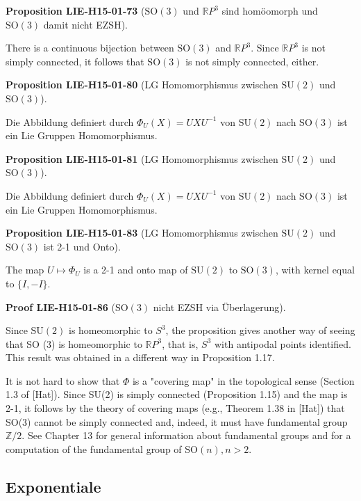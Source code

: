 \documentclass[10pt, letterpaper]{article}
\newcommand{\R}{\mathbb{R}}
\newcommand{\SO}{\mathrm{SO}}
\newcommand{\SU}{\mathrm{SU}}
\newcommand{\CustomHeading}[3]{%
  \par\medskip\noindent%
  \textbf{#1 #2} \textnormal{(#3)}.\enskip%
}
\newenvironment{PROP}[2]{\CustomHeading{Proposition}{#1}{#2}}{}
\newenvironment{PROOF}[2]{\CustomHeading{Proof}{#1}{#2}}{}
\begin{document}
\begin{PROP}{LIE-H15-01-73}{$\SO(3)$ und $\R P^3$ sind homöomorph und $\SO(3)$ damit nicht EZSH}
There is a continuous bijection between $\mathrm{SO}(3)$ and $\mathbb{R} P^{3}$. Since $\mathbb{R} P^{3}$ is not simply connected, it follows that $\mathrm{SO}(3)$ is not simply connected, either.
\end{PROP}

\begin{PROP}{LIE-H15-01-80}{LG Homomorphismus zwischen $\SU(2)$ und $\SO(3)$}
Die Abbildung definiert durch $\Phi_{U}(X)=U X U^{-1}$ von $\SU(2)$ nach $\SO(3)$ ist ein Lie Gruppen Homomorphismus.
\end{PROP}

\begin{PROP}{LIE-H15-01-81}{LG Homomorphismus zwischen $\SU(2)$ und $\SO(3)$}
Die Abbildung definiert durch $\Phi_{U}(X)=U X U^{-1}$ von $\SU(2)$ nach $\SO(3)$ ist ein Lie Gruppen Homomorphismus.
\end{PROP}

\begin{PROP}{LIE-H15-01-83}{LG Homomorphismus zwischen $\SU(2)$ und $\SO(3)$ ist 2-1 und Onto}
The map $U \mapsto \Phi_{U}$ is a 2-1 and onto map of $\mathrm{SU}(2)$ to $\mathrm{SO}(3)$, with kernel equal to $\{I,-I\}$.
\end{PROP}

\begin{PROOF}{LIE-H15-01-86}{$\SO(3)$ nicht EZSH via Überlagerung}
Since $\mathrm{SU}(2)$ is homeomorphic to $S^{3}$, the proposition gives another way of seeing that SO (3) is homeomorphic to $\mathbb{R} P^{3}$, that is, $S^{3}$ with antipodal points identified. This result was obtained in a different way in Proposition 1.17.

It is not hard to show that $\Phi$ is a "covering map" in the topological sense (Section 1.3 of [Hat]). Since SU(2) is simply connected (Proposition 1.15) and the map is 2-1, it follows by the theory of covering maps (e.g., Theorem 1.38 in [Hat]) that SO(3) cannot be simply connected and, indeed, it must have fundamental group $\mathbb{Z} / 2$. See Chapter 13 for general information about fundamental groups and for a computation of the fundamental group of $\mathrm{SO}(n), n>2$.
\end{PROOF}

\subsection{Exponentiale}
\end{document}
